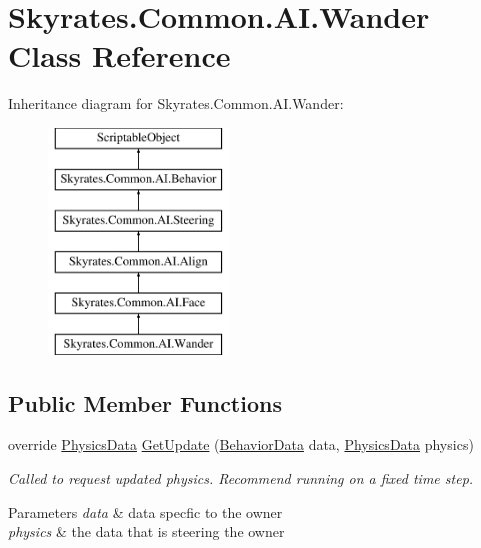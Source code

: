 \hypertarget{class_skyrates_1_1_common_1_1_a_i_1_1_wander}{\section{Skyrates.\-Common.\-A\-I.\-Wander Class Reference}
\label{class_skyrates_1_1_common_1_1_a_i_1_1_wander}
}


 


Inheritance diagram for Skyrates.\-Common.\-A\-I.\-Wander\-:\begin{figure}[H]
\begin{center}
\leavevmode
\includegraphics[height=6.000000cm]{class_skyrates_1_1_common_1_1_a_i_1_1_wander}
\end{center}
\end{figure}
\subsection*{Public Member Functions}
\begin{DoxyCompactItemize}
\item 
\hypertarget{class_skyrates_1_1_common_1_1_a_i_1_1_wander_a8d90c564b447d8a78eced00ee7db29d9}{override \hyperlink{class_skyrates_1_1_common_1_1_a_i_1_1_physics_data}{Physics\-Data} \hyperlink{class_skyrates_1_1_common_1_1_a_i_1_1_wander_a8d90c564b447d8a78eced00ee7db29d9}{Get\-Update} (\hyperlink{class_skyrates_1_1_common_1_1_a_i_1_1_behavior_data}{Behavior\-Data} data, \hyperlink{class_skyrates_1_1_common_1_1_a_i_1_1_physics_data}{Physics\-Data} physics)}\label{class_skyrates_1_1_common_1_1_a_i_1_1_wander_a8d90c564b447d8a78eced00ee7db29d9}

\begin{DoxyCompactList}\small\item\em Called to request updated physics. Recommend running on a fixed time step. 


\begin{DoxyParams}{Parameters}
{\em data} & data specfic to the owner\\
\hline
{\em physics} & the data that is steering the owner\\
\hline
\end{DoxyParams}
 \end{DoxyCompactList}\end{DoxyCompactItemize}
